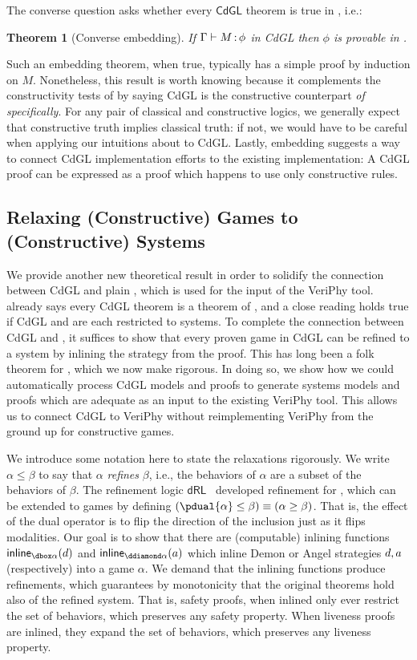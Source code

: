 \documentclass[12pt]{cmuthesis}
\newtheorem{theorem}{Theorem}
\theoremstyle{definition}
\theoremstyle{remark}
\newcommand{\rref}[2][]{\prettyref{#2}}
\newcommand{\dRL}{\ensuremath{\mathsf{dRL}}\xspace}
\newcommand{\CdGL}{\textsf{CdGL}\xspace}
\newcommand{\VeriPhy}{VeriPhy\xspace}
\begin{document}
The converse question asks whether every $\CdGL$ theorem is true in \dGL, i.e.:
\begin{theorem}[Converse embedding]
If $\Gamma\allowbreak\vdash M \allowbreak \mathop{:} \phi$ in \CdGL then $\phi$ is provable in \dGL.
\label{thm:conv-embed}
\end{theorem}
Such an embedding theorem, when true, typically has a simple proof by induction on $M$.
Nonetheless, this result is worth knowing because it complements the constructivity tests of \rref{ch:cgl} by saying \CdGL is the constructive counterpart \emph{of \dGL specifically}.
For any pair of classical and constructive logics, we generally expect that constructive truth implies classical truth: if not, we would have to be careful when applying our intuitions about \dGL to \CdGL.
Lastly, embedding suggests a way to connect \CdGL implementation efforts to the existing \dGL implementation: A \CdGL proof can be expressed as a \dGL proof which happens to use only constructive rules.

\subsection{Relaxing (Constructive) Games to (Constructive) Systems}
We provide another new theoretical result in order to solidify the connection between \CdGL and plain \dL, which is used for the input of the \VeriPhy tool.
\rref{thm:conv-embed} already says every \CdGL theorem is a theorem of \dGL, and a close reading holds true if \CdGL and \dGL are each restricted to systems.
To complete the connection between \CdGL and \dL, it suffices to show that every proven game in \CdGL can be refined to a system by inlining the strategy from the proof.
This has long been a folk theorem for \dGL, which we now make rigorous.
In doing so, we show how we could automatically process \CdGL models and proofs to generate systems models and proofs which are adequate as an input to the existing \VeriPhy tool.
This allows us to connect \CdGL to \VeriPhy without reimplementing \VeriPhy from the ground up for constructive games.

We introduce some notation here to state the relaxations rigorously.
We write $\alpha \leq \beta$ to say that $\alpha$ \emph{refines} $\beta$, i.e., the behaviors of $\alpha$ are a subset of the behaviors of $\beta$.
The refinement logic \dRL~\cite{DBLP:conf/lics/LoosP16} developed refinement for \dL, which can be extended to games by defining $(\pdual{\alpha} \leq \beta) \equiv (\alpha \geq \beta)$.
That is, the effect of the dual operator is to flip the direction of the inclusion just as it flips modalities.
Our goal is to show that there are (computable) inlining functions $\dinline{\alpha}{\da}$ and $\ainline{\alpha}{\aa}$ which inline Demon or Angel strategies $d,a$ (respectively) into a game $\alpha$.
We demand that the inlining functions produce refinements, which guarantees by monotonicity that the original theorems hold also of the refined system.
That is, safety proofs, when inlined only ever restrict the set of behaviors, which preserves any safety property.
When liveness proofs are inlined, they expand the set of behaviors, which preserves any liveness property.
\end{document}
